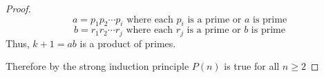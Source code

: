 \documentclass[11pt]{exam}
\begin{document}
\begin{questions}
\begin{solution}
\begin{proof}
\[a=p_1p_2\cdots p_i \text{ where each $p_i$ is a prime or } a \text{ is prime} \] 
\[b=r_1r_2\cdots r_j \text{ where each $r_j$ is a prime or } b \text{ is prime}\]
Thus, $k+1=ab$ is a product of primes.

Therefore by the strong induction principle $P(n)$ is true for all $n\geq 2$
 \end{proof}
 \end{solution}
 
 

 
\end{questions}
\end{document}
